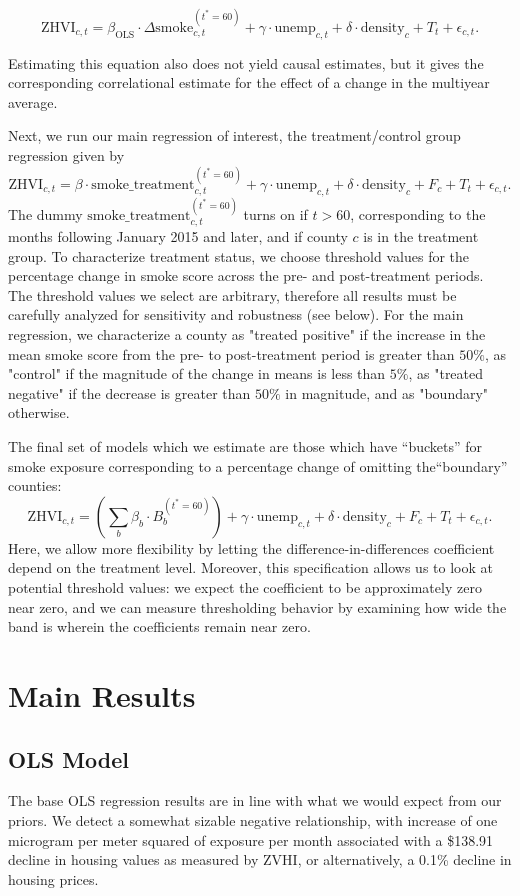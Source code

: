\documentclass[12pt]{article}
\begin{document}
$$\text{ZHVI}_{c,t} = \beta_\text{OLS}\cdot \Delta\text{smoke}^{(t^* = 60)}_{c,t} + \gamma\cdot \text{unemp}_{c,t} + \delta\cdot\text{density}_c + T_t + \epsilon_{c,t}.$$

Estimating this equation also does not yield causal estimates, but it gives the corresponding correlational estimate for the effect of a change in the multiyear average.

Next, we run our main regression of interest, the treatment/control group regression given by 
$$\text{ZHVI}_{c,t} = \beta\cdot \text{smoke\_treatment}^{(t^* = 60)}_{c,t} + \gamma\cdot \text{unemp}_{c,t} + \delta\cdot\text{density}_c + F_c + T_t + \epsilon_{c,t}.$$
The dummy $\text{smoke\_treatment}^{(t^* = 60)}_{c,t}$ turns on if $t>60$, 
corresponding to the months following January 2015 and later, and if county $c$ is 
in the treatment group.  To characterize treatment status, we choose threshold values
for the percentage change in smoke score across the pre- and post-treatment 
periods.  The threshold values we select are arbitrary, therefore all results must
be carefully analyzed for sensitivity and robustness (see below).  For the main
regression, we characterize a county as "treated positive" if the increase in the
mean smoke score from the pre- to post-treatment period is greater than $50\%$, 
as "control" if the magnitude of the change in means is less than $5\%$, as 
"treated negative" if the decrease is greater than $50\%$ in magnitude, and as 
"boundary" otherwise.  

The final set of models which we estimate are those which have ``buckets'' for smoke
exposure corresponding to a percentage change of omitting the``boundary'' counties:
$$\text{ZHVI}_{c,t} = \left(\sum_{b} \beta_b\cdot B_b^{(t^* = 60)}\right) + \gamma\cdot \text{unemp}_{c,t} + \delta\cdot\text{density}_c + F_c + T_t + \epsilon_{c,t}.$$  Here, we allow more flexibility by letting the difference-in-differences coefficient depend on the treatment level.  Moreover, this specification allows us to look at potential threshold values: we expect the coefficient to be approximately zero near zero, and we can measure thresholding behavior by examining how wide the band is wherein the coefficients remain near zero.

\section{Main Results}

\subsection{OLS Model} The base OLS regression results are in line with what we would expect from our priors.  We detect a somewhat sizable negative relationship, with increase of one microgram per meter squared of exposure per month associated with a \$138.91 decline in housing values as measured by ZVHI, or alternatively, a 0.1\% decline in housing prices.  
\end{document}
